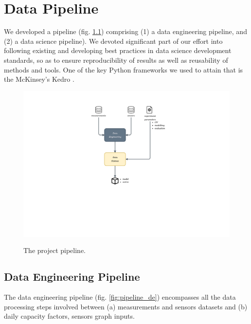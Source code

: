 \graphicspath{{./figures/pipeline/}}

\chapter{Data Pipeline}
We developed a pipeline (fig. \ref{fig:project_pipeline}) comprising (1) a data engineering pipeline, and (2) a data science pipeline).
We devoted significant part of our effort into following existing and developing best practices in data science development standards, so as to ensure reproducibility of results as well as reusability of methods and tools.
One of the key Python frameworks we used to attain that is the McKinsey's Kedro \cite{kedro}.

\begin{figure}[H]
	\centering
    \caption{The project pipeline.}
    \includegraphics[width=0.8\linewidth,trim={7cm 7cm 7cm 2cm},clip]{pipeline_project.pdf}
	\label{fig:project_pipeline}
\end{figure}


\section{Data Engineering Pipeline}
The data engineering pipeline (fig. \ref{fig:pipeline_de}) encompasses all the data processing steps involved between (a) measurements and sensors datasets and (b) daily capacity factors, sensors graph inputs.

